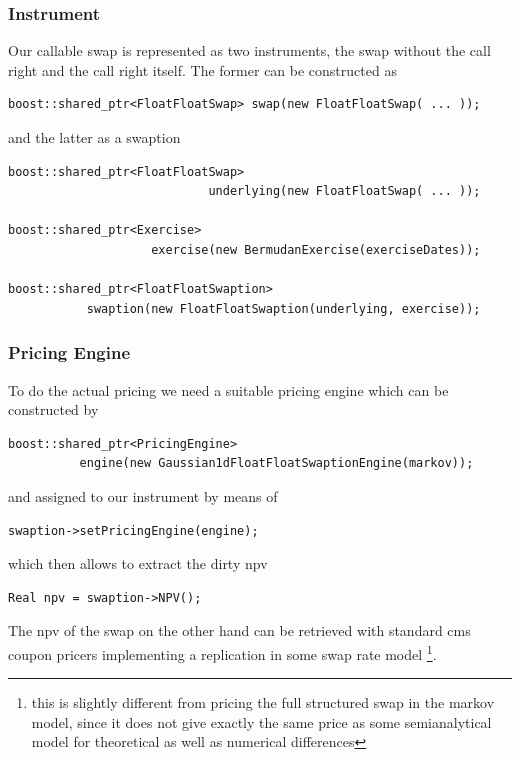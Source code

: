 \documentclass{beamer}
\begin{document}
\begin{frame}[fragile]
\frametitle{Instrument}
Our callable swap is represented as two instruments, the swap without the call right and the call right itself.
The former can be constructed as

\begin{verbatim}
boost::shared_ptr<FloatFloatSwap> swap(new FloatFloatSwap( ... ));
\end{verbatim}

and the latter as a swaption

\begin{verbatim}
boost::shared_ptr<FloatFloatSwap> 
                            underlying(new FloatFloatSwap( ... ));

boost::shared_ptr<Exercise> 
                    exercise(new BermudanExercise(exerciseDates));

boost::shared_ptr<FloatFloatSwaption> 
           swaption(new FloatFloatSwaption(underlying, exercise));
\end{verbatim}

\end{frame}


\begin{frame}[fragile]
\frametitle{Pricing Engine}
To do the actual pricing we need a suitable pricing engine which can be constructed by
\begin{verbatim}
boost::shared_ptr<PricingEngine> 
          engine(new Gaussian1dFloatFloatSwaptionEngine(markov));
\end{verbatim}
and assigned to our instrument by means of
\begin{verbatim}
swaption->setPricingEngine(engine);
\end{verbatim}

which then allows to extract the dirty npv

\begin{verbatim}
Real npv = swaption->NPV();
\end{verbatim}

The npv of the swap on the other hand can be retrieved with standard cms coupon pricers implementing
a replication in some swap rate model
\footnote{this is slightly different from pricing the full structured swap in the markov model,
since it does not give exactly the same price as some semianalytical model for theoretical as well
as numerical differences}.
\end{frame}
\end{document}
